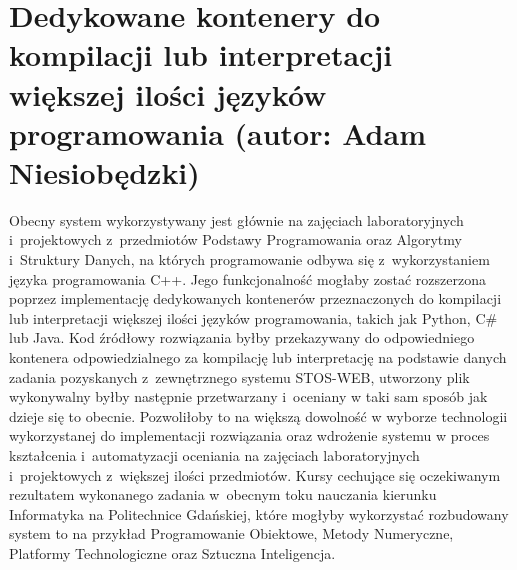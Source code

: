 \section{Dedykowane kontenery do kompilacji lub interpretacji większej ilości języków programowania (autor: Adam Niesiobędzki)}
Obecny system wykorzystywany jest głównie na zajęciach laboratoryjnych i~projektowych z~przedmiotów Podstawy Programowania oraz Algorytmy i~Struktury Danych, na których programowanie odbywa się z~wykorzystaniem języka programowania C++. Jego funkcjonalność mogłaby zostać rozszerzona poprzez implementację dedykowanych kontenerów przeznaczonych do kompilacji lub interpretacji większej ilości języków programowania, takich jak Python, C\# lub Java. Kod źródłowy rozwiązania byłby przekazywany do odpowiedniego kontenera odpowiedzialnego za kompilację lub interpretację na podstawie danych zadania pozyskanych z~zewnętrznego systemu STOS-WEB, utworzony plik wykonywalny byłby następnie przetwarzany i~oceniany w taki sam sposób jak dzieje się to obecnie. Pozwoliłoby to na większą dowolność w wyborze technologii wykorzystanej do implementacji rozwiązania oraz wdrożenie systemu w proces kształcenia i~automatyzacji oceniania na zajęciach laboratoryjnych i~projektowych z~większej ilości przedmiotów. Kursy cechujące się oczekiwanym rezultatem wykonanego zadania w~obecnym toku nauczania kierunku Informatyka na Politechnice Gdańskiej, które mogłyby wykorzystać rozbudowany system to na przykład Programowanie Obiektowe, Metody Numeryczne, Platformy Technologiczne oraz Sztuczna Inteligencja.